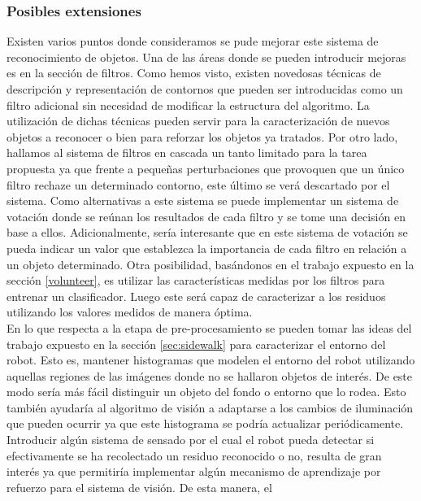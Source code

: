 \subsubsection{Posibles extensiones}
Existen varios puntos donde consideramos se pude mejorar este sistema 
de reconocimiento de objetos. Una de las áreas donde se pueden introducir mejoras es en 
la sección de filtros. Como hemos visto, existen novedosas técnicas de 
descripción y representación de contornos que pueden ser introducidas 
como un filtro adicional sin necesidad de modificar la estructura del 
algoritmo. La utilización de dichas técnicas pueden servir para 
la caracterización de nuevos objetos a reconocer o bien para reforzar 
los objetos ya tratados. Por otro lado, hallamos al sistema de filtros 
en cascada un tanto limitado para la tarea propuesta ya que frente a 
pequeñas perturbaciones que provoquen que un único filtro rechaze un 
determinado contorno, este último se verá descartado por el sistema. 
Como alternativas a este sistema se puede implementar un sistema de 
votación donde se reúnan los resultados de cada filtro y se tome una 
decisión en base a ellos. Adicionalmente, sería interesante que en 
este sistema de votación se pueda indicar un valor que establezca la 
importancia de cada filtro en relación a un objeto determinado. Otra 
posibilidad, basándonos en el trabajo \cite{potato} expuesto en la 
sección \ref{volunteer}, es utilizar las 
características medidas por los filtros para entrenar un clasificador. 
Luego este será capaz de caracterizar a los residuos utilizando los 
valores medidos de manera óptima.\\
\indent En lo que respecta a la etapa de pre-procesamiento se pueden 
tomar las ideas del trabajo \cite{sidewalk2008} expuesto en la sección \ref{sec:sidewalk} 
para caracterizar el entorno del robot. Esto es, mantener histogramas 
que modelen el entorno del robot utilizando aquellas regiones de las 
imágenes donde no se hallaron  objetos de interés. De este modo sería más fácil 
distinguir un objeto del fondo o entorno que lo rodea. Esto también 
ayudaría al algoritmo de visión a adaptarse a los cambios de 
iluminación que pueden ocurrir ya que este histograma se podría 
actualizar periódicamente.\\
\indent Introducir algún sistema de sensado por el cual el robot pueda 
detectar si efectivamente se ha recolectado un residuo reconocido o no, resulta de 
gran interés ya que permitiría implementar algún mecanismo de 
aprendizaje por refuerzo para el sistema de visión. De esta manera, el 
